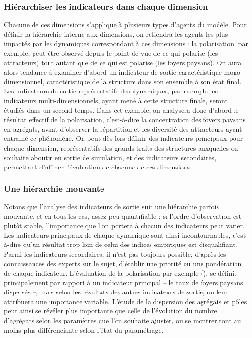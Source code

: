 \subsubsection{Hiérarchiser les indicateurs dans chaque dimension}\label{par:hierarchie_interne}
Chacune de ces dimensions s'applique à plusieurs types d'agents du modèle.
Pour définir la hiérarchie interne aux dimensions, on retiendra les agents les plus impactés par les dynamiques correspondant à ces dimensions :
la polarisation, par exemple, peut être observé depuis le point de vue de ce qui polarise (les attracteurs) tout autant que de ce qui est polarisé (les foyers paysans).
On aura alors tendance à examiner d'abord un indicateur de sortie caractéristique mono-dimensionnel, caractéristique de la structure dans son ensemble à son état final.
Les indicateurs de sortie représentatifs des dynamiques, par exemple les indicateurs multi-dimensionnels, ayant mené à cette structure finale, seront étudiés dans un second temps.
Dans cet exemple, on analysera donc d'abord le résultat effectif de la polarisation, c'est-à-dire la concentration des foyers paysans en agrégats, avant d'observer la répartition et les diversité des attracteurs ayant entrainé ce phénomène.
On peut dès lors définir des \og indicateurs principaux\fg{} pour chaque dimension, représentatifs des grands traits des structures auxquelles on souhaite aboutir en sortie de simulation, et des \og indicateurs secondaires\fg{}, permettant d'affiner l'évaluation de chacune de ces dimensions.

\subsubsection{Une hiérarchie mouvante}
Notons que l'analyse des indicateurs de sortie suit une hiérarchie parfois mouvante, et en tous les cas, assez peu quantifiable :
si l'ordre d'observation est plutôt stable, l'importance que l'on portera à chacun des indicateurs peut varier.
Les indicateurs principaux de chaque dynamique sont ainsi \og incontournables\fg{}, c'est-à-dire qu'un résultat trop loin de celui des indices empiriques est disqualifiant.
Parmi les indicateurs secondaires, il n'est pas toujours possible, d'après les connaissances des experts sur le sujet, d'établir une priorité ou une pondération de chaque indicateur.
L'évaluation de la polarisation par exemple (), se définit principalement par rapport à un indicateur principal -- le taux de foyers paysans dispersés --, mais selon les résultats des autres indicateurs de sortie, on leur attribuera une importance variable.
L'étude de la dispersion des agrégats et pôles peut ainsi se révéler plus importante que celle de l'évolution du nombre d'agrégats selon les paramètres que l'on souhaite ajuster, ou se montrer tout au moins plus différenciante selon l'état du paramétrage.

